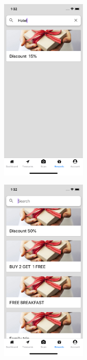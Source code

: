 \documentclass[12pt, a4paper, oneside]{article}
\begin{document}
\begin{figure}[H]

\begin{subfigure}{.5\textwidth}
    \centering
    \includegraphics[width=0.45\textwidth]{test-evidences/reward/a.png}
    \caption{}
\end{subfigure}%
\begin{subfigure}{.5\textwidth}
    \centering
    \includegraphics[width=0.45\textwidth]{test-evidences/reward/b.png}
    \caption{}
\end{subfigure}


\end{figure}
\end{document}
